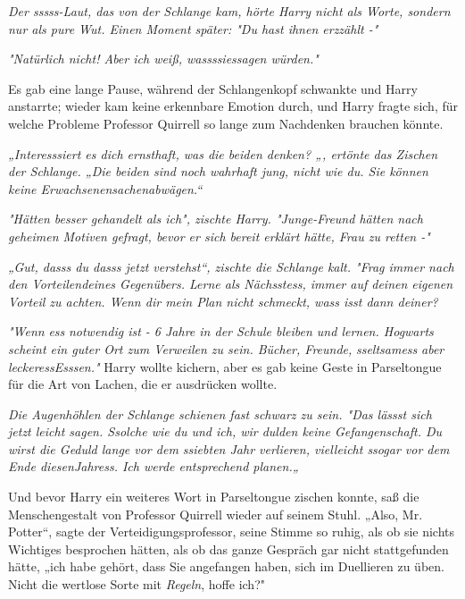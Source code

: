 {\emph{Der sssss-Laut, das von der Schlange kam, hörte Harry nicht als Worte, sondern nur als pure Wut. Einen Moment später: \emph{"Du hast ihnen} \emph{erzzählt} \emph{-"}}

\emph{\emph{"Natürlich nicht! Aber ich weiß,} \emph{wassssiessagen} \emph{würden."}}

Es gab eine lange Pause, während der Schlangenkopf schwankte und Harry anstarrte; wieder kam keine erkennbare Emotion durch, und Harry fragte sich, für welche Probleme Professor Quirrell so lange zum Nachdenken brauchen könnte.

\emph{\emph{„Interesssiert} \emph{es dich ernsthaft, was die beiden denken? „}, ertönte das Zischen der Schlange. \emph{„Die beiden} \emph{sind} \emph{noch wahrhaft jung, nicht wie} \emph{du. Sie können keine} \emph{Erwachsenensachenabwägen.“}}

\emph{\emph{"Hätten besser gehandelt} \emph{als ich"}, zischte Harry. \emph{"Junge-Freund hätten nach geheimen Motiven gefragt, bevor er sich bereit erklärt hätte, Frau zu retten -"}}

\emph{\emph{„Gut,} \emph{dasss} \emph{du} \emph{dasss} \emph{jetzt verstehst}“, zischte die Schlange kalt. \emph{"Frag immer nach den Vorteilendeines Gegenübers. Lerne als} \emph{Nächsstess, immer auf} \emph{deinen} \emph{eigenen Vorteil zu achten. Wenn} \emph{dir} \emph{mein Plan} \emph{nicht schmeckt,} \emph{wass} \emph{isst dann deiner?}}

\emph{"Wenn} \emph{ess} \emph{notwendig ist - 6 Jahre in der Schule bleiben und lernen. Hogwarts scheint ein guter Ort zum Verweilen zu sein. Bücher, Freunde,} \emph{sseltsamess} \emph{aber} \emph{leckeressEsssen."} Harry wollte kichern, aber es gab keine Geste in Parseltongue für die Art von Lachen, die er ausdrücken wollte.

\emph{Die Augenhöhlen der Schlange schienen fast schwarz zu sein. \emph{"Das} \emph{lässst} \emph{sich} \emph{jetzt} \emph{leicht sagen.} \emph{Ssolche} \emph{wie du und ich, wir dulden keine Gefangenschaft. Du wirst die Geduld lange vor dem} \emph{ssiebten} \emph{Jahr verlieren, vielleicht} \emph{ssogar} \emph{vor dem Ende diesenJahress. Ich werde entsprechend planen.„}}

Und bevor Harry ein weiteres Wort in Parseltongue zischen konnte, saß die Menschengestalt von Professor Quirrell wieder auf seinem Stuhl. „Also, Mr. Potter“, sagte der Verteidigungsprofessor, seine Stimme so ruhig, als ob sie nichts Wichtiges besprochen hätten, als ob das ganze Gespräch gar nicht stattgefunden hätte, „ich habe gehört, dass Sie angefangen haben, sich im Duellieren zu üben. Nicht die wertlose Sorte mit \emph{Regeln}, hoffe ich?"

}

